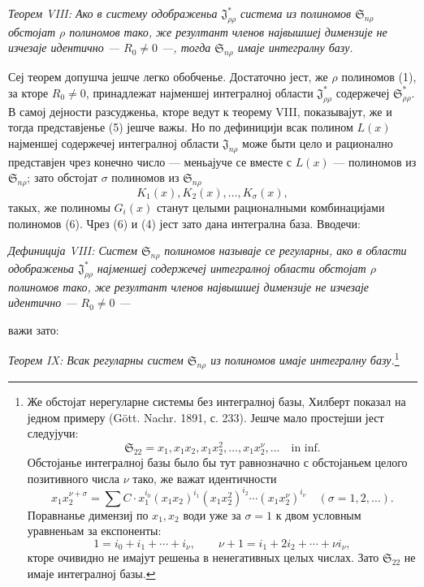 ﻿\documentclass[11pt]{article}
\providecommand{\Ssys}{\mathfrak{S}}
\providecommand{\Jdom}{\mathfrak{J}}
\begin{document}
{\itshape Теорем VIII: Ако в систему одображеньа $\Jdom^*_{\rho\rho}$ система из полиномов $\Ssys_{n\rho}$ обстојат $\rho$ полиномов тако, же резултант членов највышшеј димензије не изчезаје идентично --- $R_0\ne0$ ---, тогда $\Ssys_{n\rho}$ имаје интегралну базу.}

Сеј теорем допушча јешче легко обобченье. Достаточно јест, же $\rho$ полиномов (1), за кторе $R_0\ne0$, принадлежат најменшеј интегралној области $\Jdom^*_{\rho\rho}$ содержечеј $\Ssys^*_{\rho\rho}$. В самој дејности разсудженьа, кторе ведут к теорему VIII, показывајут, же и тогда представјенье (5) јешче важы. Но по дефиницији всак полином $L(x)$ најменшеј содержечеј интегралној области $\Jdom_{n\rho}$ може быти цело и рационално представјен чрез конечно число --- меньајуче се вместе с $L(x)$ --- полиномов из $\Ssys_{n\rho}$; зато обстојат $\sigma$ полиномов из $\Ssys_{n\rho}$
\begin{equation}
  K_1(x),K_2(x),\ldots,K_\sigma(x),
\tag{6}
\end{equation}
такых, же полиномы $G_i(x)$ станут целыми рационалными комбинацијами полиномов (6). Чрез (6) и (4) јест зато дана интегрална база. Вводечи:

{\itshape Дефиниција VIII: Систем $\Ssys_{n\rho}$ полиномов называје се регуларны, ако в области одображеньа $\Jdom^*_{\rho\rho}$ најменшеј содержечеј интегралној области обстојат $\rho$ полиномов тако, же резултант членов највышшеј димензије не изчезаје идентично --- $R_0\ne0$ ---}

важи зато:

{\itshape Теорем IX: Всак регуларны систем $\Ssys_{n\rho}$ из полиномов имаје интегралну базу.}\footnote{Же обстојат нерегуларне системы без интегралној базы, Хилберт показал на једном примеру (Gött. Nachr. 1891, с. 233). Јешче мало простејши јест следујучи:
\[
  \Ssys_{22}=x_1,
  x_1x_2,
  x_1x_2^2,
  \ldots,
  x_1x_2^\nu,
  \ldots\quad\text{in inf.}
\]
Обстојанье интегралној базы было бы тут равнозначно с обстојаньем целого позитивного числа $\nu$ тако, же важат идентичности
\[
  x_1x_2^{\nu+\sigma}=\sum C\cdot x_1^{i_0}(x_1x_2)^{i_1}(x_1x_2^2)^{i_2}\cdots(x_1x_2^\nu)^{i_\nu}
  \quad(\sigma=1,2,\ldots).
\]
Поравнанье димензиј по $x_1,x_2$ води уже за $\sigma=1$ к двом условным уравненьам за експоненты:
\[
  1=i_0+i_1+\cdots+i_\nu,
  \qquad
  \nu+1=i_1+2i_2+\cdots+\nu i_\nu,
\]
кторе очивидно не имајут решеньа в ненегативных целых числах. Зато $\Ssys_{22}$ не имаје интегралној базы.}
\end{document}
